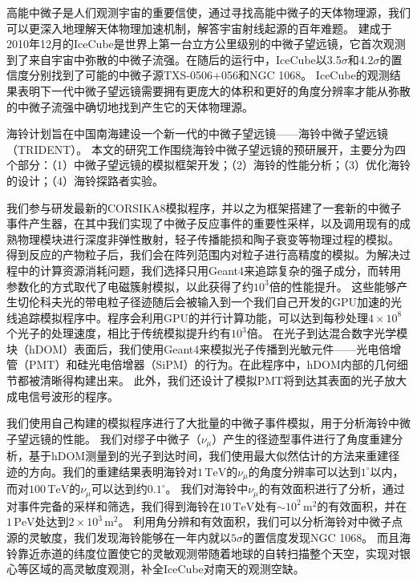 \begin{cabstract}

高能中微子是人们观测宇宙的重要信使，通过寻找高能中微子的天体物理源，我们可以更深入地理解天体物理加速机制，解答宇宙射线起源的百年难题。
建成于2010年12月的IceCube是世界上第一台立方公里级别的中微子望远镜，它首次观测到了来自宇宙中弥散的中微子流强。在随后的运行中，IceCube以3.5$\sigma$和4.2$\sigma$的置信度分别找到了可能的中微子源TXS-0506+056和NGC 1068。
IceCube的观测结果表明下一代中微子望远镜需要拥有更庞大的体积和更好的角度分辨率才能从弥散的中微子流强中确切地找到产生它的天体物理源。

海铃计划旨在中国南海建设一个新一代的中微子望远镜——海铃中微子望远镜（TRIDENT）。
本文的研究工作围绕海铃中微子望远镜的预研展开，主要分为四个部分：（1）中微子望远镜的模拟框架开发；（2）海铃的性能分析；（3）优化海铃的设计；（4）海铃探路者实验。

我们参与研发最新的CORSIKA8模拟程序，并以之为框架搭建了一套新的中微子事件产生器，在其中我们实现了中微子反应事件的重要性采样，以及调用现有的成熟物理模块进行深度非弹性散射，轻子传播能损和陶子衰变等物理过程的模拟。
得到反应的产物粒子后，我们会在阵列范围内对粒子进行高精度的模拟。为解决过程中的计算资源消耗问题，我们选择只用Geant4来追踪复杂的强子成分，而转用参数化的方式取代了电磁簇射模拟，以此获得了约$10^3$倍的性能提升。
这些能够产生切伦科夫光的带电粒子径迹随后会被输入到一个我们自己开发的GPU加速的光线追踪模拟程序中。程序会利用GPU的并行计算功能，可以达到每秒处理$4\times 10^8$个光子的处理速度，相比于传统模拟提升约有$10^3$倍。
在光子到达混合数字光学模块（hDOM）表面后，我们使用Geant4来模拟光子传播到光敏元件——光电倍增管（PMT）和硅光电倍增器（SiPM）的行为。在此程序中，hDOM内部的几何细节都被清晰得构建出来。
此外，我们还设计了模拟PMT将到达其表面的光子放大成电信号波形的程序。

我们使用自己构建的模拟程序进行了大批量的中微子事件模拟，用于分析海铃中微子望远镜的性能。
我们对缪子中微子（$\nu_\mu$）产生的径迹型事件进行了角度重建分析，基于hDOM测量到的光子到达时间，我们使用最大似然估计的方法来重建径迹的方向。我们的重建结果表明海铃对$1\,\mathrm{TeV}$的$\nu_\mu$的角度分辨率可以达到$1^\circ$以内，而对$100\,\mathrm{TeV}$的$\nu_\mu$可以达到约$0.1^\circ$。
我们对海铃中$\nu_\mu$的有效面积进行了分析，通过对事件完备的采样和筛选，我们得到海铃在$10\,\mathrm{TeV}$处有$\sim 10^2\,\mathrm{m^2}$的有效面积，并在$1\,\mathrm{PeV}$处达到$2 \times 10^3\,\mathrm{m^2}$。
利用角分辨和有效面积，我们可以分析海铃对中微子点源的灵敏度，我们发现海铃能够在一年内就以$5\sigma$的置信度发现NGC 1068。
而且海铃靠近赤道的纬度位置使它的灵敏观测带随着地球的自转扫描整个天空，实现对银心等区域的高灵敏度观测，补全IceCube对南天的观测空缺。


\end{cabstract}
